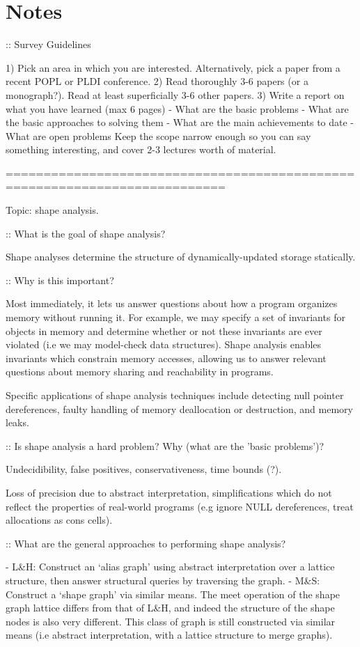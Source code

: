 \documentclass{article}
\begin{document}
\section*{Notes}

:: Survey Guidelines

1) Pick an area in which you are interested. Alternatively, pick a paper
   from a recent POPL or PLDI conference. 
2) Read thoroughly 3-6 papers (or a monograph?). Read at least superficially
   3-6 other papers. 
3) Write a report on what you have learned (max 6 pages)
        - What are the basic problems
        - What are the basic approaches to solving them
        - What are the main achievements to date
        - What are open problems
Keep the scope narrow enough so you can say something interesting, and cover
2-3 lectures worth of material.

===========================================================================

Topic: shape analysis.

:: What is the goal of shape analysis?

Shape analyses determine the structure of dynamically-updated storage
statically.

:: Why is this important?

Most immediately, it lets us answer questions about how a program organizes
memory without running it. For example, we may specify a set of invariants
for objects in memory and determine whether or not these invariants are ever
violated (i.e we may model-check data structures). Shape analysis enables
invariants which constrain memory accesses, allowing us to answer relevant
questions about memory sharing and reachability in programs.

Specific applications of shape analysis techniques include detecting null
pointer dereferences, faulty handling of memory deallocation or destruction,
and memory leaks.

:: Is shape analysis a hard problem? Why (what are the 'basic problems')?

Undecidibility, false positives, conservativeness, time bounds (?).

Loss of precision due to abstract interpretation, simplifications which do not
reflect the properties of real-world programs (e.g ignore NULL dereferences,
treat allocations as cons cells).

:: What are the general approaches to performing shape analysis?

- L\&H: Construct an `alias graph' using abstract interpretation over a lattice
  structure, then answer structural queries by traversing the graph.
- M\&S: Construct a `shape graph' via similar means. The meet operation of the
  shape graph lattice differs from that of L\&H, and indeed the structure of the
  shape nodes is also very different. This class of graph is still constructed
  via similar means (i.e abstract interpretation, with a lattice structure to
  merge graphs).
\end{document}
